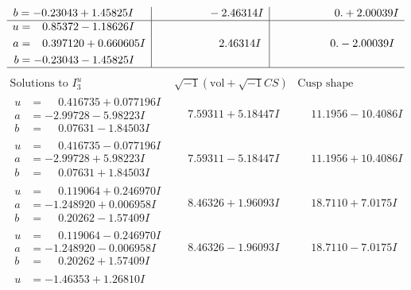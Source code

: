 \documentclass[1p]{elsarticle_modified}
\theoremstyle{definition}
\newcommand{\I}{\sqrt{-1}}
\begin{document}
$$\begin{array}{c|c|c}
\begin{aligned}
b &= -0.23043 + 1.45825 I\end{aligned}
 & \phantom{-0.000000 } -2.46314 I & \phantom{-0.000000 -}0. + 2.00039 I \\ \hline\begin{aligned}
u &= \phantom{-}0.85372 - 1.18626 I \\
a &= \phantom{-}0.397120 + 0.660605 I \\
b &= -0.23043 - 1.45825 I\end{aligned}
 & \phantom{-0.000000 -}2.46314 I & \phantom{-0.000000 } 0. - 2.00039 I\\
 \hline 
 \end{array}$$\newpage$$\begin{array}{c|c|c}  
\text{Solutions to }I^u_{3}& \I (\text{vol} + \sqrt{-1}CS) & \text{Cusp shape}\\
 \hline 
\begin{aligned}
u &= \phantom{-}0.416735 + 0.077196 I \\
a &= -2.99728 - 5.98223 I \\
b &= \phantom{-}0.07631 - 1.84503 I\end{aligned}
 & \phantom{-}7.59311 + 5.18447 I & \phantom{-}11.1956 - 10.4086 I \\ \hline\begin{aligned}
u &= \phantom{-}0.416735 - 0.077196 I \\
a &= -2.99728 + 5.98223 I \\
b &= \phantom{-}0.07631 + 1.84503 I\end{aligned}
 & \phantom{-}7.59311 - 5.18447 I & \phantom{-}11.1956 + 10.4086 I \\ \hline\begin{aligned}
u &= \phantom{-}0.119064 + 0.246970 I \\
a &= -1.248920 + 0.006958 I \\
b &= \phantom{-}0.20262 - 1.57409 I\end{aligned}
 & \phantom{-}8.46326 + 1.96093 I & \phantom{-}18.7110 + 7.0175 I \\ \hline\begin{aligned}
u &= \phantom{-}0.119064 - 0.246970 I \\
a &= -1.248920 - 0.006958 I \\
b &= \phantom{-}0.20262 + 1.57409 I\end{aligned}
 & \phantom{-}8.46326 - 1.96093 I & \phantom{-}18.7110 - 7.0175 I \\ \hline\begin{aligned}
u &= -1.46353 + 1.26810 I \\

\end{aligned}
\end{array}$$
\end{document}
